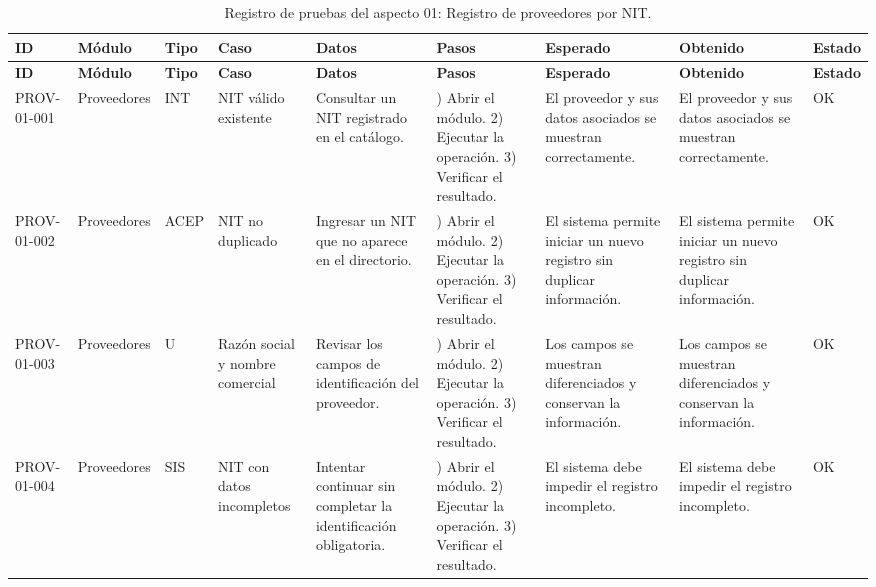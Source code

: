 \begingroup\fontsize{8}{10}\selectfont\renewcommand{\arraystretch}{1.25}\setlength{\tabcolsep}{2pt}
\begin{xltabular}{\linewidth}{@{}
>{\raggedright\arraybackslash}p{1.35cm}
>{\raggedright\arraybackslash}p{1.25cm}
>{\centering\arraybackslash}p{0.90cm}
>{\raggedright\arraybackslash}p{1.75cm}
>{\raggedright\arraybackslash}p{1.90cm}
>{\raggedright\arraybackslash}p{2.10cm}
>{\raggedright\arraybackslash}p{2.05cm}
>{\raggedright\arraybackslash}p{2.05cm}
>{\centering\arraybackslash}p{0.95cm}
@{}}

\caption{Registro de pruebas del aspecto 01: Registro de proveedores por NIT.}\label{tab:cap4_aspecto_prov_01}\\
\toprule
\textbf{ID} & \textbf{Módulo} & \textbf{Tipo} & \textbf{Caso} & \textbf{Datos} & \textbf{Pasos} & \textbf{Esperado} & \textbf{Obtenido} & \textbf{Estado}\\
\midrule
\endfirsthead
\toprule
\textbf{ID} & \textbf{Módulo} & \textbf{Tipo} & \textbf{Caso} & \textbf{Datos} & \textbf{Pasos} & \textbf{Esperado} & \textbf{Obtenido} & \textbf{Estado}\\
\midrule
\endhead
\endfoot
\bottomrule
\endlastfoot
PROV-01-001 & Proveedores & INT & NIT válido existente & Consultar un NIT registrado en el catálogo. & 1) Abrir el módulo. 2) Ejecutar la operación. 3) Verificar el resultado. & El proveedor y sus datos asociados se muestran correctamente. & El proveedor y sus datos asociados se muestran correctamente. & OK\\
\addlinespace
PROV-01-002 & Proveedores & ACEP & NIT no duplicado & Ingresar un NIT que no aparece en el directorio. & 1) Abrir el módulo. 2) Ejecutar la operación. 3) Verificar el resultado. & El sistema permite iniciar un nuevo registro sin duplicar información. & El sistema permite iniciar un nuevo registro sin duplicar información. & OK\\
\addlinespace
PROV-01-003 & Proveedores & U & Razón social y nombre comercial & Revisar los campos de identificación del proveedor. & 1) Abrir el módulo. 2) Ejecutar la operación. 3) Verificar el resultado. & Los campos se muestran diferenciados y conservan la información. & Los campos se muestran diferenciados y conservan la información. & OK\\
\addlinespace
PROV-01-004 & Proveedores & SIS & NIT con datos incompletos & Intentar continuar sin completar la identificación obligatoria. & 1) Abrir el módulo. 2) Ejecutar la operación. 3) Verificar el resultado. & El sistema debe impedir el registro incompleto. & El sistema debe impedir el registro incompleto. & OK\\

\end{xltabular}
